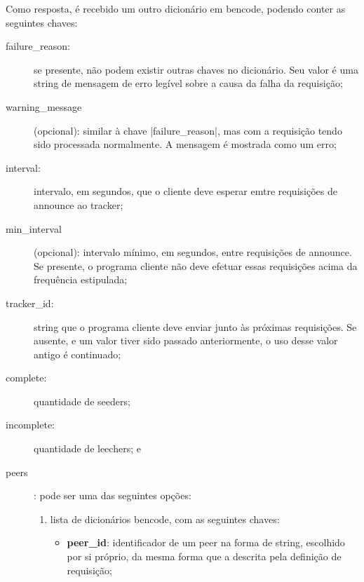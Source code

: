 
Como resposta, é recebido um outro dicionário em \gls*{bencode}, podendo conter as
seguintes chaves:

\begin{description}
    \item[failure\_reason:] se presente, não podem existir outras chaves no dicionário.
        Seu valor é uma \gls*{string} de mensagem de erro legível sobre a causa da falha
        da requisição;

    \item[warning\_message] (opcional): similar à chave \bverb|failure_reason|, mas com
        a requisição tendo sido processada normalmente. A mensagem é mostrada como um
        erro;

    \item[interval:] intervalo, em segundos, que o cliente deve esperar emtre
        requisições de \gls*{announce} ao \gls*{tracker};

    \item[min\_interval] (opcional): intervalo mínimo, em segundos, entre requisições
        de \gls*{announce}. Se presente, o programa cliente não deve efetuar essas
        requisições acima da frequência estipulada;

    \item[tracker\_id:] \gls*{string} que o programa cliente deve enviar junto às
        próximas requisições. Se ausente, e um valor tiver sido passado anteriormente, o
        uso desse valor antigo é continuado;

    \item[complete:] quantidade de \glspl*{seeder};

    \item[incomplete:] quantidade de \glspl*{leecher}; e

    \item[\glspl*{peer}]: pode ser uma das seguintes opções:

        \begin{enumerate}
            \item lista de dicionários \gls*{bencode}, com as seguintes chaves:

            \begin{itemize}
                \item \textbf{peer\_id}: identificador de um \gls*{peer} na forma de
                    \gls*{string}, escolhido por si próprio, da mesma forma que a
                    descrita pela definição de requisição;


\end{itemize}
\end{enumerate}
\end{description}
